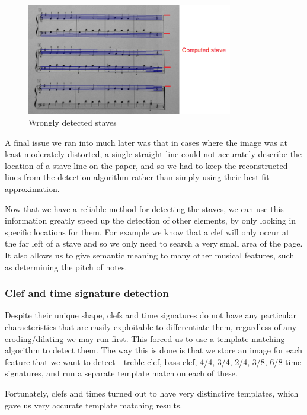 \begin{figure}[h!]
    \centering
    \includegraphics[width=90mm]{./assets/brokenStaves.jpg}
    \caption{Wrongly detected staves}
    \label{image:brokenstaves}
\end{figure}

A final issue we ran into much later was that in cases where the image was at least moderately distorted, a single straight line could not accurately describe the location of a stave line on the paper, and so we had to keep the reconstructed lines from the detection algorithm rather than simply using their best-fit approximation.

Now that we have a reliable method for detecting the staves, we can use this information greatly speed up the detection of other elements, by only looking in specific locations for them.  For example we know that a clef will only occur at the far left of a stave and so we only need to search a very small area of the page. It also allows us to give semantic meaning to many other musical features, such as determining the pitch of notes.

\subsubsection{Clef and time signature detection}

Despite their unique shape, clefs and time signatures do not have any particular characteristics that are easily exploitable to differentiate them, regardless of any eroding/dilating we may run first. This forced us to use a template matching algorithm to detect them. The way this is done is that we store an image for each feature that we want to detect - treble clef, bass clef, 4/4, 3/4, 2/4, 3/8, 6/8 time signatures, and run a separate
template match on each of these.

Fortunately, clefs and times turned out to have very distinctive templates, which gave us very accurate template matching results.

